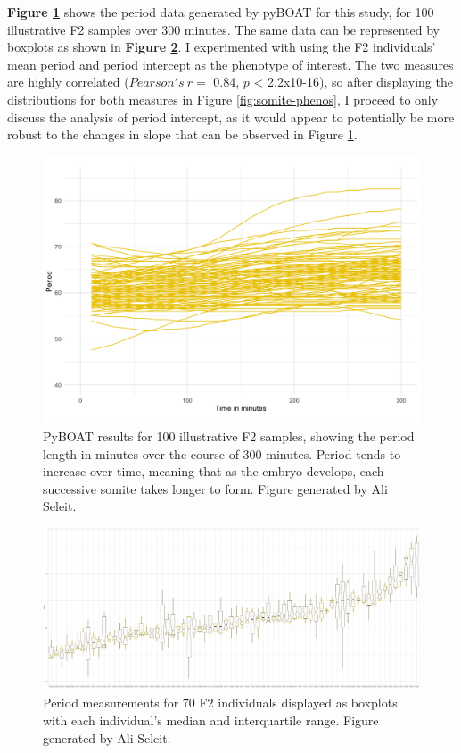 \documentclass[
]{book}
\begin{document}
\textbf{Figure \ref{fig:ali-somite-period-lines}} shows the period data generated by pyBOAT for this study, for 100 illustrative F2 samples over 300 minutes. The same data can be represented by boxplots as shown in \textbf{Figure \ref{fig:ali-somite-period-box}}. I experimented with using the F2 individuals' mean period and period intercept as the phenotype of interest. The two measures are highly correlated (\(Pearson's~r =\) 0.84, \(p\) \textless{} 2.2x10-16), so after displaying the distributions for both measures in Figure \ref{fig:somite-phenos}, I proceed to only discuss the analysis of period intercept, as it would appear to potentially be more robust to the changes in slope that can be observed in Figure \ref{fig:ali-somite-period-lines}.



\begin{figure}
\includegraphics[width=1\linewidth]{figs/somites/ali_period_lines_100fish300mins} \caption{PyBOAT results for 100 illustrative F2 samples, showing the period length in minutes over the course of 300 minutes. Period tends to increase over time, meaning that as the embryo develops, each successive somite takes longer to form. Figure generated by Ali Seleit.}\label{fig:ali-somite-period-lines}
\end{figure}



\begin{figure}
\includegraphics[width=1\linewidth]{figs/somites/ali_F2_mean_period} \caption{Period measurements for 70 F2 individuals displayed as boxplots with each individual's median and interquartile range. Figure generated by Ali Seleit.}\label{fig:ali-somite-period-box}
\end{figure}
\end{document}
